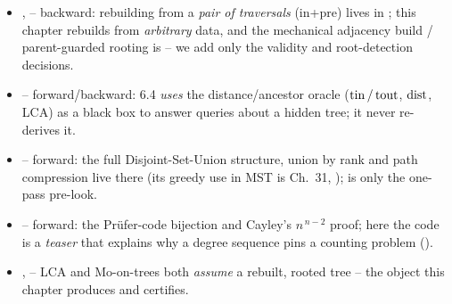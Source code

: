 \begin{itemize}[nosep, leftmargin=1.4em]
  \item {},  -- backward: rebuilding from a \emph{pair of traversals}
        (in+pre) lives in ; this chapter rebuilds from \emph{arbitrary} data, and the
        mechanical adjacency build / parent-guarded rooting is  -- we add only
        the validity and root-detection decisions.
  \item {} -- forward/backward: 6.4 \emph{uses} the distance/ancestor oracle ($\operatorname{tin}/\operatorname{tout}$,
        $\operatorname{dist}$, LCA) as a black box to answer queries about a hidden tree; it never re-derives it.
  \item {} -- forward: the full Disjoint-Set-Union structure, union by rank and path
        compression live there (its greedy use in MST is Ch.~31, );  is only the one-pass pre-look.
  \item {} -- forward: the Pr\"ufer-code bijection and Cayley's $n^{\,n-2}$ proof; here the
        code is a \emph{teaser} that explains why a degree sequence pins a counting problem
        ().
  \item {},  -- LCA and Mo-on-trees both \emph{assume} a rebuilt, rooted tree
        -- the object this chapter produces and certifies.
\end{itemize}

